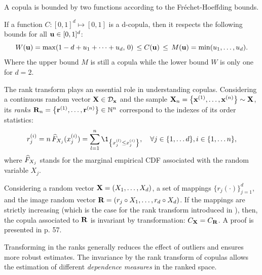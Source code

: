 A copula is bounded by two functions according to the Fréchet-Hoeffding bounds. 
\begin{theorem}
    If a function $C:[0, 1]^d \mapsto [0, 1]$ is a d-copula, then it respects the following bounds for all ${\bf u} \in [0, 1]^d$: 
    \begin{equation}
        W({\bf u}) = \max (1 - d + u_1 + \dots + u_d, \, 0) \, \leq C({\bf u}) \, \leq \, M({\bf u}) = \min(u_1,\dots ,u_d).
    \end{equation} 
    Where the upper bound $M$ is still a copula while the lower bound $W$ is only one for $d=2$.
\end{theorem}

The rank transform plays an essential role in understanding copulas. 
Considering a continuous random vector ${\bf X} \in \mathcal{D}_{{\bf x}}$ and the sample ${\bf X}_n = \left\{{\bf x}^{(1)}, \dots, {\bf x}^{(n)}\right\} \sim {\bf X}$, its \textit{ranks} ${\bf R}_n = \left\{{\bf r}^{(1)}, \dots, {\bf r}^{(n)}\right\} \in \mathbb{N}^{n}$ correspond to the indexes of its order statistics: 
\begin{equation}
    r^{(i)}_j = n \, \what{F}_{X_j}(x_j^{(i)}) = \sum_{l=1}^n \1_{\left\{x^{(l)}_j \leq x^{(i)}_j\right\}}, \quad \forall j \in \{1, \dots d\}, i \in \{1, \dots n\},
    \label{eq:ranks}  
\end{equation}
where $\widehat{F}_{X_j}$ stands for the marginal empirical CDF associated with the random variable $X_j$.


\begin{theorem}
    Considering a random vector ${\bf X}=(X_1, \dots, X_d)$, a set of mappings $\{r_j (\cdot)\}_{j=1}^d$, and the image random vector ${\bf R}=(r_j \circ X_1, \dots, r_d \circ X_d)$. 
    If the mappings are strictly increasing (which is the case for the rank transform introduced in ), then, the copula associated to ${\bf R}$ is invariant by transformation: $C_{\bf X} = C_{\bf R}$. 
    A proof is presented in \citet{durante_2015_copula} p. 57.
\end{theorem}

Transforming in the ranks generally reduces the effect of outliers and ensures more robust estimates. 
The invariance by the rank transform of copulas allows the estimation of different \textit{dependence measures} in the ranked space. 


